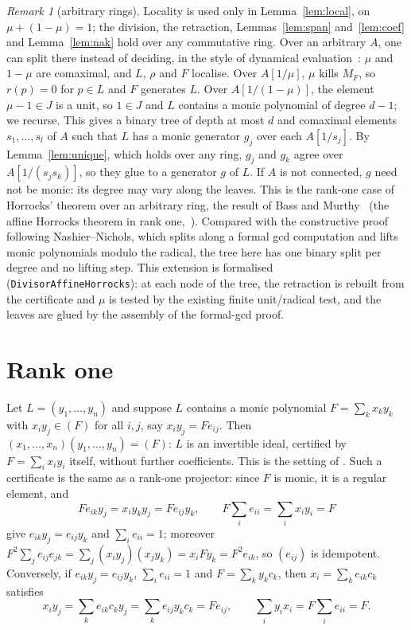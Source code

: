 \documentclass[11pt]{amsart}
\theoremstyle{remark}
\newtheorem{remark}[theorem]{Remark}
\begin{document}
\begin{remark}[arbitrary rings]\label{rem:dynamic}
Locality is used only in Lemma~\ref{lem:local}, on $\mu+(1-\mu)=1$; the
division, the retraction, Lemmas~\ref{lem:span} and~\ref{lem:coef} and
Lemma~\ref{lem:nak} hold over any commutative ring. Over an arbitrary $A$,
one can split there instead of deciding, in the style of dynamical
evaluation~\cite[XIV.1]{LQ}: $\mu$ and $1-\mu$ are comaximal, and $L$,
$\rho$ and $F$ localise. Over $A[1/\mu]$, $\mu$ kills $M_F$, so $r(p)=0$ for
$p\in L$ and $F$ generates $L$. Over $A[1/(1-\mu)]$, the element $\mu-1\in J$
is a unit, so $1\in J$ and $L$ contains a monic polynomial of degree $d-1$;
we recurse. This gives a binary tree of depth at most $d$ and comaximal
elements $s_1,\dots,s_l$ of $A$ such that $L$ has a monic generator $g_j$
over each $A[1/s_j]$. By Lemma~\ref{lem:unique}, which holds over any
ring, $g_j$ and $g_k$ agree over $A[1/(s_js_k)]$, so they glue to a
generator $g$ of $L$. If $A$ is not connected, $g$ need not be monic: its
degree may vary along the leaves. This is the rank-one case of Horrocks'
theorem over an arbitrary ring, the result of Bass and Murthy~\cite{BM}
(the affine Horrocks theorem in rank one,~\cite[V.2]{Lam}). Compared with
the constructive proof following Nashier--Nichols, which splits along a
formal gcd computation and lifts monic polynomials modulo the radical, the
tree here has one binary split per degree and no lifting step. This
extension is formalised (\texttt{DivisorAffineHorrocks}): at each node of
the tree, the retraction is rebuilt from the certificate and $\mu$ is tested
by the existing finite unit/radical test, and the leaves are glued by the
assembly of the formal-gcd proof.
\end{remark}

\section{Rank one}\label{sec:rankone}

Let $L=(y_1,\dots,y_n)$ and suppose $L$ contains a monic polynomial
$F=\sum_kx_ky_k$ with $x_iy_j\in(F)$ for all $i,j$, say $x_iy_j=Fe_{ij}$.
Then $(x_1,\dots,x_n)(y_1,\dots,y_n)=(F)$: $L$ is an invertible ideal,
certified by $F=\sum_ix_iy_i$ itself, without further coefficients. This is
the setting of \cite[Prop.~IV.5.2]{Lam}. Such a certificate is the same as a
rank-one projector: since $F$ is monic, it is a regular element, and
\[
F e_{ik}y_j=x_iy_ky_j=Fe_{ij}y_k,\qquad F\textstyle\sum_ie_{ii}=\sum_ix_iy_i=F
\]
give $e_{ik}y_j=e_{ij}y_k$ and $\sum_ie_{ii}=1$; moreover
$F^2\sum_je_{ij}e_{jk}=\sum_j(x_iy_j)(x_jy_k)=x_iFy_k=F^2e_{ik}$, so
$(e_{ij})$ is idempotent. Conversely, if $e_{ik}y_j=e_{ij}y_k$,
$\sum_ie_{ii}=1$ and $F=\sum_ky_kc_k$, then $x_i=\sum_ke_{ik}c_k$ satisfies
\[
x_iy_j=\textstyle\sum_k e_{ik}c_ky_j=\sum_k e_{ij}y_kc_k = Fe_{ij},
\qquad \sum_iy_ix_i=F\sum_ie_{ii}=F .
\]
\end{document}
